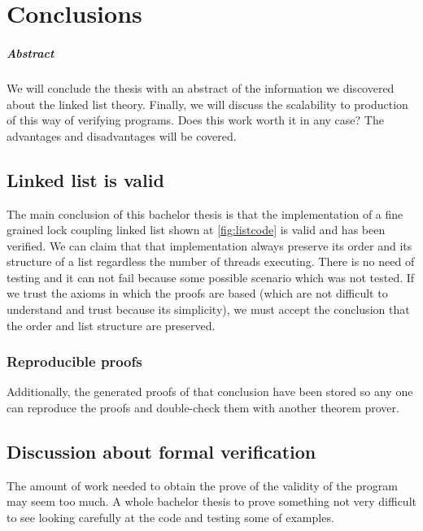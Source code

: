 \chapter{Conclusions\label{sec:conclusiones}}

\paragraph{Abstract} We will conclude the thesis with an abstract of the information we discovered about the linked list theory.
%
Finally, we will discuss the scalability to production of this way of verifying programs.
%
Does this work worth it in any case? 
%
The advantages and disadvantages will be covered.

\section{Linked list is valid}

The main conclusion of this bachelor thesis is that the implementation of a fine grained lock coupling linked list shown at \ref{fig:listcode} is valid and has been verified. 
%
We can claim that that implementation always preserve its order and its structure of a list regardless the number of threads executing. 
%
There is no need of testing and it can not fail because some possible scenario which was not tested. 
% 
If we trust the axioms in which the proofs are based (which are not difficult to understand and trust because its simplicity), we must accept the conclusion that the order and list structure are preserved.

\subsection{Reproducible proofs}

Additionally, the generated proofs of that conclusion have been stored so any one can reproduce the proofs and double-check them with another theorem prover.


\section{Discussion about formal verification}

The amount of work needed to obtain the prove of the validity of the program may seem too much.
%
A whole bachelor thesis to prove something not very difficult to see looking carefully at the code and testing some of examples.

